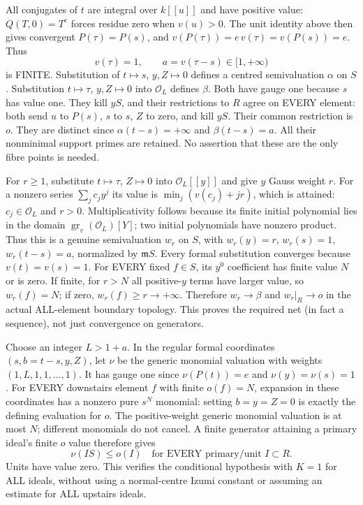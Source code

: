 All conjugates of $t$ are integral over $k[[u]]$ and have positive value:
$Q(T,0)=T^e$ forces residue zero when $v(u)>0$. The unit identity above
then gives convergent $P(\tau)=P(s)$, and
$v(P(\tau))=e\,v(\tau)=v(P(s))=e$. Thus
\[
 v(\tau)=1,\qquad a=v(\tau-s)\in[1,+\infty)
\]
is FINITE. Substitution of $t\mapsto s$, $y,Z\mapsto0$ defines a
centred semivaluation $\alpha$ on $S$. Substitution
$t\mapsto\tau$, $y,Z\mapsto0$ into $\mathcal O_L$ defines $\beta$.
Both have gauge one because $s$ has value one. They kill $yS$, and their
restrictions to $R$ agree on EVERY element: both send $u$ to $P(s)$,
$s$ to $s$, $Z$ to zero, and kill $yS$. Their common restriction is $o$.
They are distinct since $\alpha(t-s)=+\infty$ and $\beta(t-s)=a$.
All their nonminimal support primes are retained. No assertion that these
are the only fibre points is needed.

For $r\ge1$, substitute $t\mapsto\tau$, $Z\mapsto0$ into
$\mathcal O_L[[y]]$ and give $y$ Gauss weight $r$. For a nonzero series
$\sum_j c_jy^j$ its value is $\min_j(v(c_j)+jr)$, which is attained:
$c_j\in\mathcal O_L$ and $r>0$. Multiplicativity follows because its
finite initial polynomial lies in the domain
$\operatorname{gr}_v(\mathcal O_L)[Y]$; two initial polynomials have
nonzero product. Thus this is a genuine semivaluation $w_r$ on $S$,
with $w_r(y)=r$, $w_r(s)=1$, $w_r(t-s)=a$, normalized by $\mathfrak mS$.
Every formal substitution converges because $v(t)=v(s)=1$.
For EVERY fixed $f\in S$, its $y^0$ coefficient has finite value $N$ or
is zero. If finite, for $r>N$ all positive-$y$ terms have larger value,
so $w_r(f)=N$; if zero, $w_r(f)\ge r\to+\infty$.
Therefore $w_r\to\beta$ and $w_r|_R\to o$ in the actual ALL-element
boundary topology. This proves the required net (in fact a sequence),
not just convergence on generators.

Choose an integer $L>1+a$. In the regular formal coordinates
$(s,b=t-s,y,Z)$, let $\nu$ be the generic monomial valuation with
weights $(1,L,1,1,\ldots,1)$. It has gauge one since $\nu(P(t))=e$
and $\nu(y)=\nu(s)=1$. For EVERY downstairs element $f$ with finite
$o(f)=N$, expansion in these coordinates has a nonzero pure $s^N$
monomial: setting $b=y=Z=0$ is exactly the defining evaluation for $o$.
The positive-weight generic monomial valuation is at most $N$; different
monomials do not cancel. A finite generator attaining a primary ideal's
finite $o$ value therefore gives
\[
 \nu(IS)\le o(I)\quad\text{for EVERY primary/unit }I\subset R.
\]
Units have value zero. This verifies the conditional hypothesis with
$K=1$ for ALL ideals, without using a normal-centre Izumi constant or
assuming an estimate for ALL upstairs ideals.

